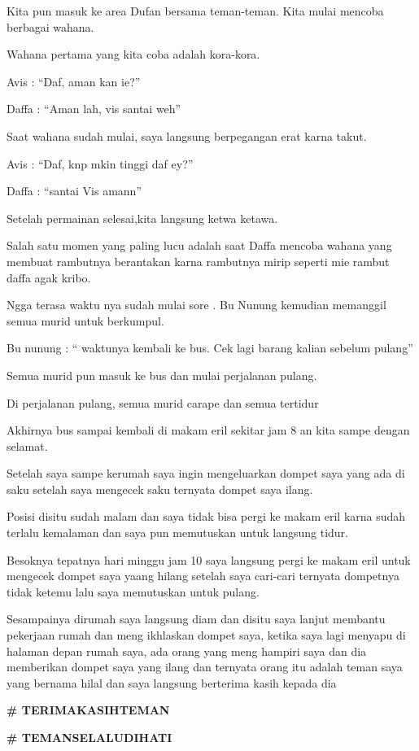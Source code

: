 Kita pun masuk ke area Dufan bersama teman-teman. Kita mulai mencoba berbagai wahana.


Wahana pertama yang kita coba adalah kora-kora.


Avis : “Daf, aman kan ie?”


Daffa : “Aman lah, vis santai weh”


Saat wahana sudah mulai, saya langsung berpegangan erat karna takut.


Avis : “Daf, knp mkin tinggi daf ey?”


Daffa : “santai Vis amann”


Setelah permainan selesai,kita langsung ketwa ketawa.


Salah satu momen yang paling lucu adalah saat Daffa mencoba wahana yang membuat rambutnya berantakan karna rambutnya mirip seperti mie rambut daffa agak kribo.


Ngga terasa waktu nya sudah mulai sore . Bu Nunung kemudian memanggil semua murid untuk berkumpul.


Bu nunung : “ waktunya kembali ke bus. Cek lagi barang kalian sebelum pulang”


Semua murid pun masuk ke bus dan mulai perjalanan pulang.


Di perjalanan pulang, semua murid carape dan semua tertidur


Akhirnya bus sampai kembali di makam eril sekitar jam 8 an kita sampe dengan selamat.


Setelah saya sampe kerumah saya ingin mengeluarkan dompet saya yang ada di saku setelah saya mengecek saku ternyata dompet saya ilang.


Posisi disitu sudah malam dan saya tidak bisa pergi ke makam eril karna sudah terlalu kemalaman dan saya pun memutuskan untuk langsung tidur.


Besoknya tepatnya hari minggu jam 10 saya langsung pergi ke makam eril untuk mengecek dompet saya yaang hilang setelah saya cari-cari ternyata dompetnya tidak ketemu lalu saya memutuskan untuk pulang.


Sesampainya dirumah saya langsung diam dan disitu saya lanjut membantu pekerjaan rumah dan meng ikhlaskan dompet saya, ketika saya lagi menyapu di halaman depan rumah saya, ada orang yang meng hampiri saya dan dia memberikan dompet saya yang ilang dan ternyata orang itu adalah teman saya yang bernama hilal dan saya langsung berterima kasih kepada dia


\textbf{\# TERIMAKASIHTEMAN}

\textbf{\# TEMANSELALUDIHATI}

\jedahias

